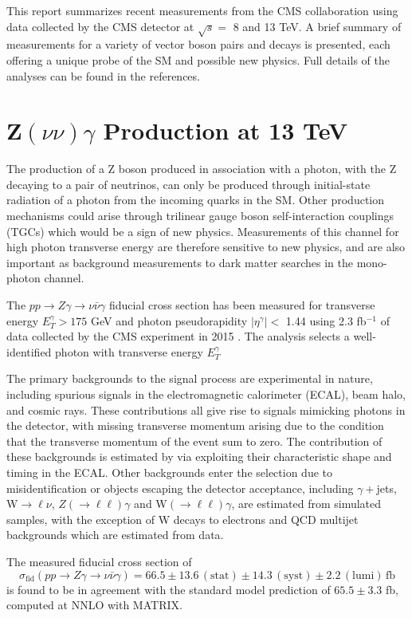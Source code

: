 \documentclass[10pt]{article}
\begin{document}
This report summarizes recent measurements from the CMS collaboration using
data collected by the CMS detector at $\sqrt{s} =$ 8 and 13 TeV. A brief summary
of measurements for a variety of vector boson pairs and decays is presented, 
each offering a unique probe of the SM and possible new physics. Full details of 
the analyses can be found in the references.

\section{Z$(\nu\nu)\gamma$ Production at 13 TeV}
The production of a Z boson produced in association with a photon,
with the Z decaying to a pair of neutrinos, can only be produced through
initial-state radiation of a photon from the incoming quarks in the SM.
Other production mechanisms could arise through trilinear gauge boson 
self-interaction couplings (TGCs) which would be a sign of new physics. 
Measurements of this channel for high photon transverse energy are therefore
sensitive to new physics, and are also important as background measurements to
dark matter searches in the mono-photon channel.

The $pp \rightarrow Z\gamma \rightarrow \nu\bar{\nu}\gamma$ fiducial cross section 
has been measured for transverse energy $E_{T}^{\gamma} > 175$ GeV and photon pseudorapidity
$\lvert\eta^{\gamma}\rvert < $ 1.44 using 2.3 fb$^{-1}$ of data collected by the CMS experiment in 2015
\cite{CMS-PAS-SMP-16-004}.
The analysis selects a well-identified photon with transverse energy $E_{T}^{\gamma}$

The primary backgrounds to the signal process are experimental in nature, including 
spurious signals in the electromagnetic calorimeter (ECAL), beam halo, and cosmic rays. 
These contributions all give rise to signals mimicking photons in the detector, 
with missing transverse momentum arising due to the 
condition that the transverse momentum of the event sum to zero. The contribution of
these backgrounds is estimated
by via exploiting their characteristic shape and timing in the ECAL. Other backgrounds 
enter the selection due to misidentification or objects escaping the detector acceptance,
including $\gamma+$jets, W$\rightarrow \ell\nu$, $Z(\rightarrow\ell\ell)\gamma$ and 
W$(\rightarrow\ell\ell)\gamma$, are estimated from simulated samples, with the exception
of W decays to electrons and QCD multijet backgrounds which are estimated from data.

The measured fiducial cross section of
\begin{equation}
  \sigma_{\mathrm{fid}}(pp \rightarrow Z\gamma \rightarrow \nu\bar{\nu}\gamma) = 66.5 \pm 13.6 \, \mathrm{(stat)} \pm 14.3 \, 
        \mathrm{(syst)} \pm 2.2 \, \mathrm{(lumi)} \,\mathrm{fb}
\end{equation}
is found to be in agreement with the standard model prediction of $65.5 \pm 3.3$ fb, computed at
NNLO with MATRIX. \cite{bleh}
\end{document}
